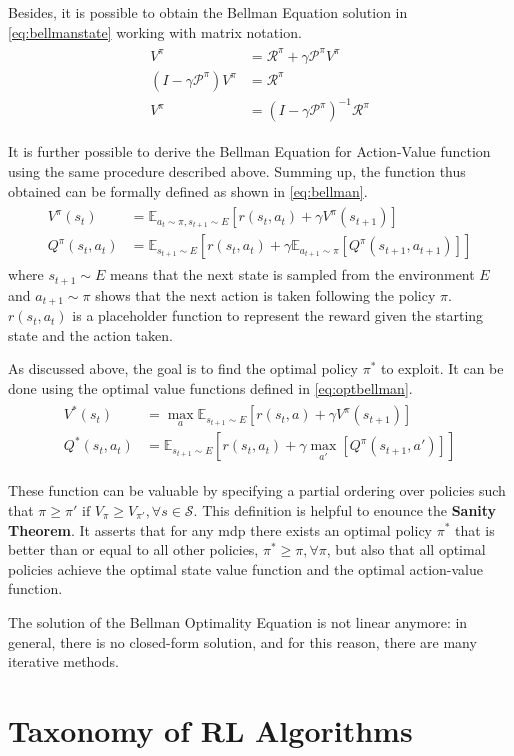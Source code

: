 Besides, it is possible to obtain the Bellman Equation solution in \vref{eq:bellmanstate} working with matrix notation.
\begin{align} \label{eq:bellmanstate}
	\begin{split}
	V^\pi &= \mathcal{R}^\pi + \gamma \mathcal{P}^\pi V^\pi \\
	(I - \gamma\mathcal{P}^\pi)V^\pi &= \mathcal{R}^\pi \\
	V^\pi &= (I - \gamma\mathcal{P}^\pi)^{-1}\mathcal{R}^\pi
	\end{split}
\end{align}

It is further possible to derive the Bellman Equation for Action-Value function using the same procedure described above. Summing up, the function thus obtained can be formally defined as shown in \vref{eq:bellman}.
\begin{align} \label{eq:bellman}
	\begin{split}
V^\pi(s_t) &= \mathbb{E}_{a_t \sim \pi, s_{t+1} \sim E}[r(s_t, a_t) + \gamma V^\pi(s_{t+1})] \\
Q^\pi(s_t,a_t) &= \mathbb{E}_{s_{t+1} \sim E}[r(s_t, a_t) + \gamma \mathbb{E}_{ a_{t+1} \sim \pi}[Q^\pi(s_{t+1}, a_{t+1})]]
\end{split}
\end{align}
where $s_{t+1}\sim \mathit{E}$ means that the next state is sampled from the environment $E$ and $a_{t+1}\sim \pi$ shows that the next action is taken following the policy $\pi$. $r(s_t, a_t)$ is a placeholder function to represent the reward given the starting state and the action taken.

As discussed above, the goal is to find the optimal policy $\pi^*$ to exploit. It can be done using the optimal value functions defined in \vref{eq:optbellman}. 
\begin{align} \label{eq:optbellman}
\begin{split}
V^*(s_t) &= \max_{a} \mathbb{E}_{s_{t+1} \sim E}[r(s_t, a) + \gamma V^\pi(s_{t+1})] \\
Q^*(s_t,a_t) &= \mathbb{E}_{s_{t+1} \sim E}[r(s_t, a_t) + \gamma \max_{a'}[Q^\pi(s_{t+1}, a')]]
\end{split}
\end{align}

These function can be valuable by specifying a partial ordering over policies such that $\pi \ge \pi' \text{ if } V_\pi \ge V_{\pi'},\forall s \in \mathcal{S}$.
This definition is helpful to enounce the \textbf{Sanity Theorem}. It asserts that for any \acrshort{mdp} there exists an optimal policy $\pi^*$ that is better than or equal to all other policies, $\pi^* \ge \pi, \forall \pi$, but also that all optimal policies achieve the optimal state value function and the optimal action-value function.

The solution of the Bellman Optimality  Equation is not linear anymore: in general, there is no closed-form solution, and for this reason, there are many iterative methods.

\section{Taxonomy of RL Algorithms}










